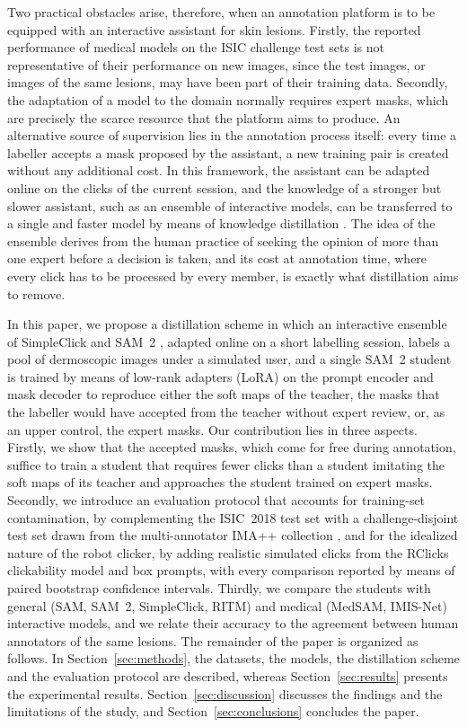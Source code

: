 \documentclass[runningheads]{llncs}
\begin{document}
Two practical obstacles arise, therefore, when an annotation platform is to be equipped with an interactive assistant for skin lesions. Firstly, the reported performance of medical models on the ISIC challenge test sets is not representative of their performance on new images, since the test images, or images of the same lesions, may have been part of their training data. Secondly, the adaptation of a model to the domain normally requires expert masks, which are precisely the scarce resource that the platform aims to produce. An alternative source of supervision lies in the annotation process itself: every time a labeller accepts a mask proposed by the assistant, a new training pair is created without any additional cost. In this framework, the assistant can be adapted online on the clicks of the current session, and the knowledge of a stronger but slower assistant, such as an ensemble of interactive models, can be transferred to a single and faster model by means of knowledge distillation \cite{hinton2015distill}. The idea of the ensemble derives from the human practice of seeking the opinion of more than one expert before a decision is taken, and its cost at annotation time, where every click has to be processed by every member, is exactly what distillation aims to remove.

In this paper, we propose a distillation scheme in which an interactive ensemble of SimpleClick \cite{liu2023simpleclick} and SAM~2 \cite{ravi2025sam2}, adapted online on a short labelling session, labels a pool of dermoscopic images under a simulated user, and a single SAM~2 student is trained by means of low-rank adapters (LoRA) \cite{hu2022lora} on the prompt encoder and mask decoder to reproduce either the soft maps of the teacher, the masks that the labeller would have accepted from the teacher without expert review, or, as an upper control, the expert masks. Our contribution lies in three aspects. Firstly, we show that the accepted masks, which come for free during annotation, suffice to train a student that requires fewer clicks than a student imitating the soft maps of its teacher and approaches the student trained on expert masks. Secondly, we introduce an evaluation protocol that accounts for training-set contamination, by complementing the ISIC~2018 test set with a challenge-disjoint test set drawn from the multi-annotator IMA++ collection \cite{abhishek2024imapp}, and for the idealized nature of the robot clicker, by adding realistic simulated clicks from the RClicks clickability model \cite{antonov2024rclicks} and box prompts, with every comparison reported by means of paired bootstrap confidence intervals. Thirdly, we compare the students with general (SAM, SAM~2, SimpleClick, RITM) and medical (MedSAM, IMIS-Net) interactive models, and we relate their accuracy to the agreement between human annotators of the same lesions. The remainder of the paper is organized as follows. In Section~\ref{sec:methods}, the datasets, the models, the distillation scheme and the evaluation protocol are described, whereas Section~\ref{sec:results} presents the experimental results. Section~\ref{sec:discussion} discusses the findings and the limitations of the study, and Section~\ref{sec:conclusions} concludes the paper.
\end{document}
